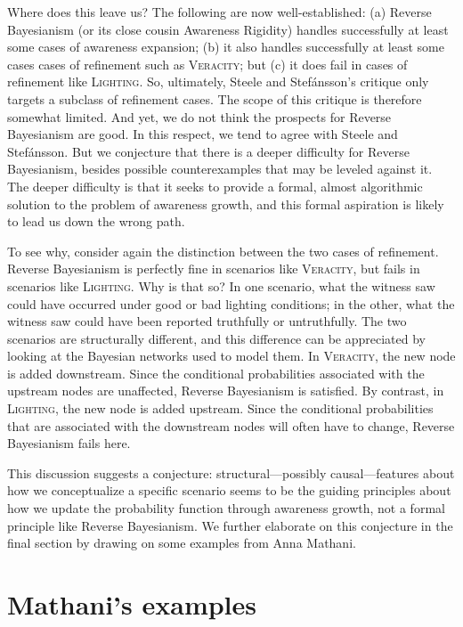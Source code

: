 \documentclass[
  11pt,
  dvipsnames,enabledeprecatedfontcommands]{scrartcl}
\begin{document}
Where does this leave us? The following are now well-established: (a)
Reverse Bayesianism (or its close cousin Awareness Rigidity) handles
successfully at least some cases of awareness expansion; (b) it also
handles successfully at least some cases cases of refinement such as
\textsc{Veracity}; but (c) it does fail in cases of refinement like
\textsc{Lighting}. So, ultimately, Steele and Stefánsson's critique only
targets a subclass of refinement cases. The scope of this critique is
therefore somewhat limited. And yet, we do not think the prospects for
Reverse Bayesianism are good. In this respect, we tend to agree with
Steele and Stefánsson. But we conjecture that there is a deeper
difficulty for Reverse Bayesianism, besides possible counterexamples
that may be leveled against it. The deeper difficulty is that it seeks
to provide a formal, almost algorithmic solution to the problem of
awareness growth, and this formal aspiration is likely to lead us down
the wrong path.

To see why, consider again the distinction between the two cases of
refinement. Reverse Bayesianism is perfectly fine in scenarios like
\textsc{Veracity}, but fails in scenarios like \textsc{Lighting}. Why is
that so? In one scenario, what the witness saw could have occurred under
good or bad lighting conditions; in the other, what the witness saw
could have been reported truthfully or untruthfully. The two scenarios
are structurally different, and this difference can be appreciated by
looking at the Bayesian networks used to model them. In
\textsc{Veracity}, the new node is added downstream. Since the
conditional probabilities associated with the upstream nodes are
unaffected, Reverse Bayesianism is satisfied. By contrast, in
\textsc{Lighting}, the new node is added upstream. Since the conditional
probabilities that are associated with the downstream nodes will often
have to change, Reverse Bayesianism fails here.

This discussion suggests a conjecture: structural---possibly
causal---features about how we conceptualize a specific scenario seems
to be the guiding principles about how we update the probability
function through awareness growth, not a formal principle like Reverse
Bayesianism. We further elaborate on this conjecture in the final
section by drawing on some examples from Anna Mathani.

\hypertarget{mathanis-examples}{%
\section{Mathani's examples}\label{mathanis-examples}}
\end{document}
